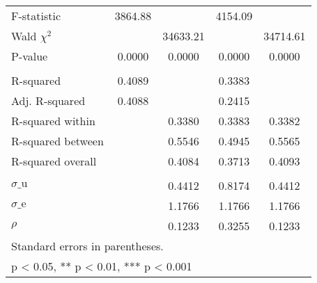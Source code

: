 {\begin{tabular}{l*{4}{c}}
\\ F-statistic      &     3864.88         &                     &     4154.09         &                     \\
Wald $\chi^2$       &                     &    34633.21         &                     &    34714.61         \\
P-value             &      0.0000         &      0.0000         &      0.0000         &      0.0000         \\
\\ R-squared        &      0.4089         &                     &      0.3383         &                     \\
Adj. R-squared      &      0.4088         &                     &      0.2415         &                     \\
R-squared within    &                     &      0.3380         &      0.3383         &      0.3382         \\
R-squared between   &                     &      0.5546         &      0.4945         &      0.5565         \\
R-squared overall   &                     &      0.4084         &      0.3713         &      0.4093         \\
\\ $\sigma\text{\_u}$&                     &      0.4412         &      0.8174         &      0.4412         \\
$\sigma\text{\_e}$   &                     &      1.1766         &      1.1766         &      1.1766         \\
$\rho$              &                     &      0.1233         &      0.3255         &      0.1233         \\
\bottomrule
\multicolumn{5}{l}{\footnotesize Standard errors in parentheses.}\\
\multicolumn{5}{l}{\footnotesize * p < 0.05, ** p < 0.01, *** p < 0.001}\\
\end{tabular}
}
